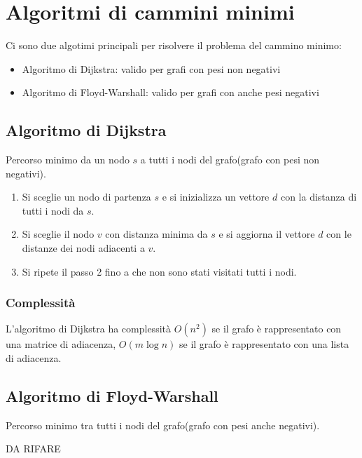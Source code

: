   \chapter{Algoritmi di cammini minimi}


  Ci sono due algotimi principali per risolvere il problema del cammino minimo:
  \begin{itemize}
    \item Algoritmo di Dijkstra: valido per grafi con pesi non negativi
    \item Algoritmo di Floyd-Warshall: valido per grafi con anche pesi negativi
  \end{itemize}


  \section{Algoritmo di Dijkstra}
  Percorso minimo da un nodo $s$ a tutti i nodi del grafo(grafo con pesi non negativi).

  \begin{enumerate}
    \item Si sceglie un nodo di partenza $s$ e si inizializza un vettore $d$ con la distanza di tutti i nodi da $s$.
    \item Si sceglie il nodo $v$ con distanza minima da $s$ e si aggiorna il vettore $d$ con le distanze dei nodi adiacenti a $v$.
    \item Si ripete il passo 2 fino a che non sono stati visitati tutti i nodi.
  \end{enumerate}


  \subsection{Complessit\`a}
  L'algoritmo di Dijkstra ha complessit\`a $O(n^2)$ se il grafo \`e rappresentato con una matrice di adiacenza, $O(m \log n)$ se il grafo \`e rappresentato con una lista di adiacenza.



  \section{Algoritmo di Floyd-Warshall}
  Percorso minimo tra tutti i nodi del grafo(grafo con pesi anche negativi).

  DA RIFARE

